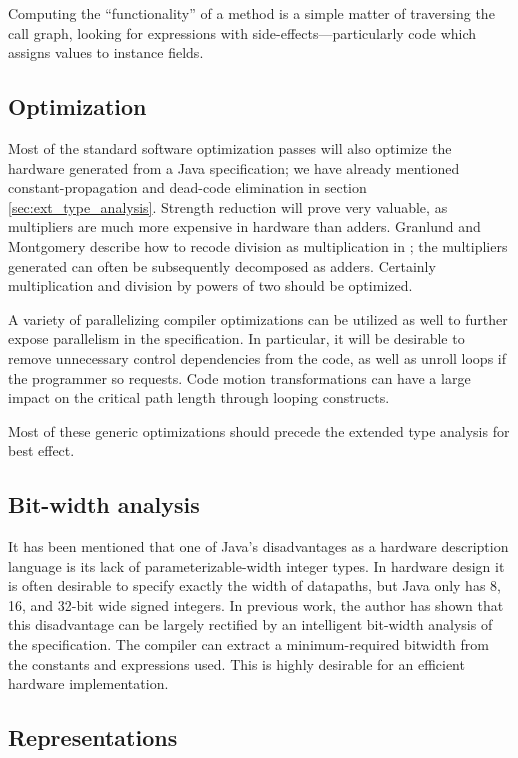 \documentclass[11pt,notitlepage,twocolumn]{article}
\begin{document}
Computing the ``functionality'' of a method is a simple matter of
traversing the call graph, looking for expressions with
side-effects---particularly code which assigns values to instance
fields.

\subsection{Optimization}
Most of the standard software optimization passes will also optimize
the hardware generated from a Java specification; we have already
mentioned constant-propagation and dead-code elimination in section
\ref{sec:ext_type_analysis}.  Strength reduction will prove very
valuable, as multipliers are much more expensive in hardware than
adders.  Granlund and Montgomery describe how to recode division as
multiplication in \cite{granlund94:divopt}; the multipliers generated
can often be subsequently decomposed as adders.  Certainly
multiplication and division by powers of two should be optimized.

A variety of parallelizing compiler optimizations can be utilized as
well to further expose parallelism in the specification.  In
particular, it will be desirable to remove unnecessary control
dependencies from the code, as well as unroll loops if the programmer
so requests.  Code motion transformations can have a large impact on
the critical path length through looping constructs.

Most of these generic optimizations should precede the extended type
analysis for best effect.

\subsection{Bit-width analysis}
It has been mentioned that one of Java's disadvantages as a hardware
description language is its lack of parameterizable-width integer
types.  In hardware design it is often desirable to specify exactly
the width of datapaths, but Java only has 8, 16, and 32-bit wide
signed integers.  In previous work, the author has shown that this
disadvantage can be largely rectified by an intelligent bit-width
analysis of the specification.  The compiler can extract
a minimum-required bitwidth from the constants and expressions used.
This is highly desirable for an efficient hardware implementation.

\subsection{Representations}
\end{document}
